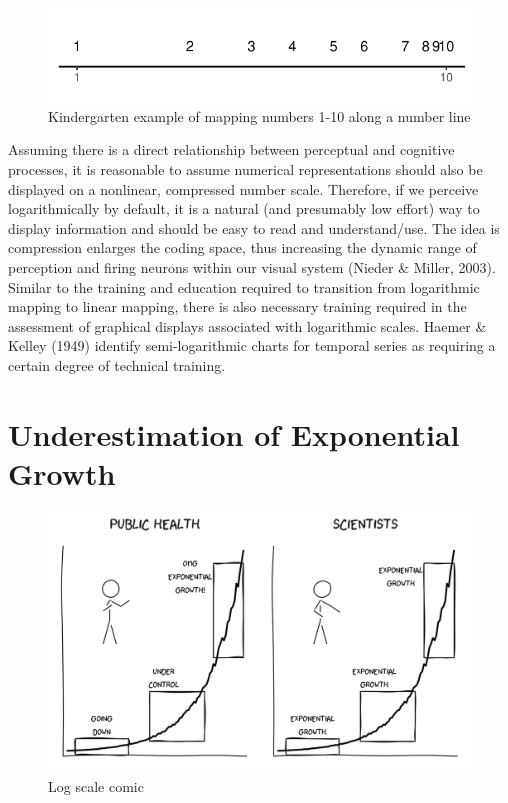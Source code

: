 \documentclass[print]{nuthesis}
\begin{document}
\begin{figure}[tbp]

{\centering \includegraphics[width=0.65\linewidth,]{thesis_files/figure-latex/log-number-line-1} 

}

\caption{Kindergarten example of mapping numbers 1-10 along a number line}\label{fig:log-number-line}
\end{figure}

Assuming there is a direct relationship between perceptual and cognitive processes, it is reasonable to assume numerical representations should also be displayed on a nonlinear, compressed number scale. Therefore, if we perceive logarithmically by default, it is a natural (and presumably low effort) way to display information and should be easy to read and understand/use.
The idea is compression enlarges the coding space, thus increasing the dynamic range of perception and firing neurons within our visual system (Nieder \& Miller, 2003).
Similar to the training and education required to transition from logarithmic mapping to linear mapping, there is also necessary training required in the assessment of graphical displays associated with logarithmic scales. Haemer \& Kelley (1949) identify semi-logarithmic charts for temporal series as requiring a certain degree of technical training.

\hypertarget{underestimation}{%
\section{Underestimation of Exponential Growth}\label{underestimation}}


\begin{figure}[tbp]

{\centering \includegraphics[width=1\linewidth,]{images/exponential-stages-comic} 

}

\caption{Log scale comic}\label{fig:exponential-stages-comic}
\end{figure}
\end{document}

